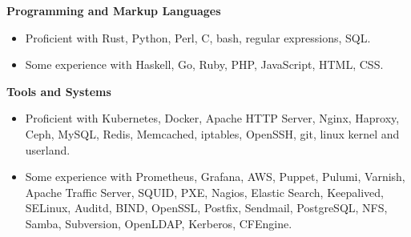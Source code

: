 \documentclass[line]{res}
\begin{document}
\begin{resume}
\textbf{Programming and Markup Languages}
\begin{itemize}
\item Proficient with Rust, Python, Perl, C, bash, regular expressions, SQL.
\item Some experience with Haskell, Go, Ruby, PHP, JavaScript, HTML, CSS.
\end{itemize}

\textbf{Tools and Systems}
\begin{itemize}
\item Proficient with Kubernetes, Docker, Apache HTTP Server, Nginx, Haproxy, Ceph, MySQL, Redis, Memcached, iptables, OpenSSH, git, linux kernel and userland.
\item Some experience with Prometheus, Grafana, AWS, Puppet, Pulumi, Varnish, Apache Traffic Server, SQUID, PXE, Nagios, Elastic Search, Keepalived, SELinux, Auditd, BIND, OpenSSL, Postfix, Sendmail, PostgreSQL, NFS, Samba, Subversion, OpenLDAP, Kerberos, CFEngine.
\end{itemize}

\end{resume}
\end{document}
